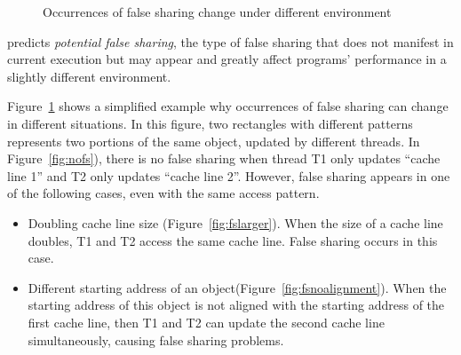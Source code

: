 \begin{figure}
\begin{center} 
%
\hspace{30pt}
%
\hspace{30pt}
%
\end{center}
\caption{Occurrences of false sharing change under different environment}
\label{fig:potentialfalsesharing}
\end{figure}

\Predator{} predicts {\it potential false sharing}, the type of
false sharing that does not 
manifest in current execution but may appear and greatly affect programs' performance
in a slightly different environment.

Figure~\ref{fig:potentialfalsesharing} shows a simplified example why occurrences of false sharing 
can change in different situations.
In this figure, two rectangles with different patterns
represents two portions of the same object, updated by different threads. 
In Figure~\ref{fig:nofs}), there is no false sharing when thread T1 only updates 
``cache line 1'' and T2 only updates ``cache line 2''.
However, false sharing appears in one of the following cases, even with the same
access pattern. 

\begin{itemize}
\item
Doubling cache line size (Figure~\ref{fig:fslarger}). When the size of a
cache line doubles,
T1 and T2 access the same cache line. False sharing occurs in this case.

\item
Different starting address of an object(Figure~\ref{fig:fsnoalignment}). 
When the starting address of this object is not aligned with the starting address of 
the first cache line, 
then T1 and T2 can update the second cache line simultaneously, 
causing false sharing problems. 
\end{itemize} 

